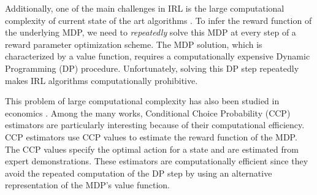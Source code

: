\documentclass{article}
\begin{document}
Additionally, one of the main challenges in IRL is the large computational complexity of current state of the art algorithms \cite{ziebart, Ratliff2006}. 
To infer the reward function of the underlying MDP, we need to \textit{repeatedly} solve this MDP at every step of a reward parameter optimization scheme.
The MDP solution, which is characterized by a value function, requires a computationally expensive Dynamic Programming (DP) procedure. Unfortunately, solving this DP step repeatedly makes IRL algorithms computationally prohibitive.

This problem of large computational complexity has also been studied in economics \cite{hotz, su2012constrained, aguirregabiria2002swapping}.
Among the many works, Conditional Choice Probability (CCP) estimators \cite{hotz} are particularly interesting because of their computational efficiency.
CCP estimators use CCP values to estimate the reward function of the MDP.
The CCP values specify the optimal action for a state and are estimated from expert demonstrations.
These estimators are computationally efficient since they avoid the repeated computation of the DP step by using an alternative representation of the MDP's value function. 

\end{document}
